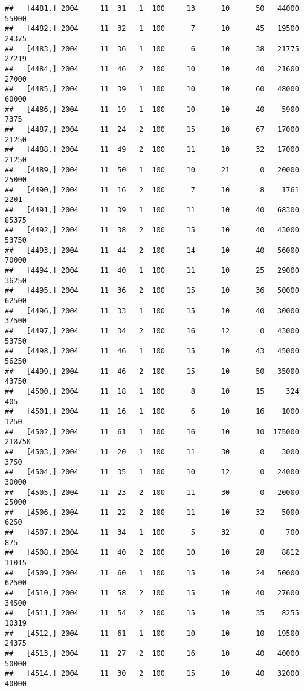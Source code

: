 \documentclass{article}\usepackage[]{graphicx}\usepackage[]{color}
\makeatletter
\newenvironment{kframe}{%
 \def\at@end@of@kframe{}%
 \ifinner\ifhmode%
  \def\at@end@of@kframe{\end{minipage}}%
  \begin{minipage}{\columnwidth}%
 \fi\fi%
 \def\FrameCommand##1{\hskip\@totalleftmargin \hskip-\fboxsep
 \colorbox{shadecolor}{##1}\hskip-\fboxsep
     \hskip-\linewidth \hskip-\@totalleftmargin \hskip\columnwidth}%
 \MakeFramed {\advance\hsize-\width
   \@totalleftmargin\z@ \linewidth\hsize
   \@setminipage}}%
 {\par\unskip\endMakeFramed%
 \at@end@of@kframe}
\newenvironment{knitrout}{}{} %
\makeatother
\begin{document}
\begin{knitrout}
\begin{kframe}
\begin{verbatim}
##   [4481,] 2004     11  31   1  100     13      10      50   44000   55000
##   [4482,] 2004     11  32   1  100      7      10      45   19500   24375
##   [4483,] 2004     11  36   1  100      6      10      38   21775   27219
##   [4484,] 2004     11  46   2  100     10      10      40   21600   27000
##   [4485,] 2004     11  39   1  100     10      10      60   48000   60000
##   [4486,] 2004     11  19   1  100     10      10      40    5900    7375
##   [4487,] 2004     11  24   2  100     15      10      67   17000   21250
##   [4488,] 2004     11  49   2  100     11      10      32   17000   21250
##   [4489,] 2004     11  50   1  100     10      21       0   20000   25000
##   [4490,] 2004     11  16   2  100      7      10       8    1761    2201
##   [4491,] 2004     11  39   1  100     11      10      40   68300   85375
##   [4492,] 2004     11  38   2  100     15      10      40   43000   53750
##   [4493,] 2004     11  44   2  100     14      10      40   56000   70000
##   [4494,] 2004     11  40   1  100     11      10      25   29000   36250
##   [4495,] 2004     11  36   2  100     15      10      36   50000   62500
##   [4496,] 2004     11  33   1  100     15      10      40   30000   37500
##   [4497,] 2004     11  34   2  100     16      12       0   43000   53750
##   [4498,] 2004     11  46   1  100     15      10      43   45000   56250
##   [4499,] 2004     11  46   2  100     15      10      50   35000   43750
##   [4500,] 2004     11  18   1  100      8      10      15     324     405
##   [4501,] 2004     11  16   1  100      6      10      16    1000    1250
##   [4502,] 2004     11  61   1  100     16      10      10  175000  218750
##   [4503,] 2004     11  20   1  100     11      30       0    3000    3750
##   [4504,] 2004     11  35   1  100     10      12       0   24000   30000
##   [4505,] 2004     11  23   2  100     11      30       0   20000   25000
##   [4506,] 2004     11  22   2  100     11      10      32    5000    6250
##   [4507,] 2004     11  34   1  100      5      32       0     700     875
##   [4508,] 2004     11  40   2  100     10      10      28    8812   11015
##   [4509,] 2004     11  60   1  100     15      10      24   50000   62500
##   [4510,] 2004     11  58   2  100     15      10      40   27600   34500
##   [4511,] 2004     11  54   2  100     15      10      35    8255   10319
##   [4512,] 2004     11  61   1  100     10      10      10   19500   24375
##   [4513,] 2004     11  27   2  100     16      10      40   40000   50000
##   [4514,] 2004     11  30   2  100     15      10      40   32000   40000

\end{verbatim}
\end{kframe}
\end{knitrout}
\end{document}
